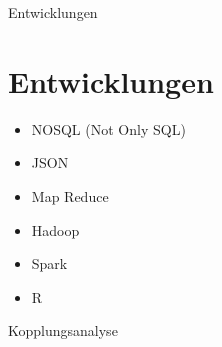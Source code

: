 \documentclass[11pt]{beamer}
\begin{document}
\begin{frame}{Entwicklungen}
\section{Entwicklungen}
	\begin{itemize}
	\item NOSQL (Not Only SQL)
	\item JSON 
	\item Map Reduce
	\item Hadoop
	\item Spark
	\item R
	\end{itemize}
\end{frame}


\begin{frame}{Kopplungsanalyse}
\begin{figure}
	\end{figure}
\end{frame}

%
\end{document}
